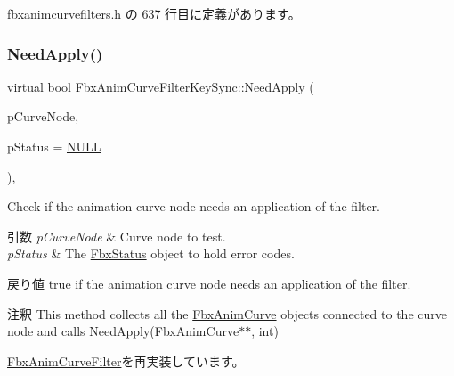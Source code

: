  fbxanimcurvefilters.\+h の 637 行目に定義があります。

\mbox{\label{class_fbx_anim_curve_filter_key_sync_a72cb983cb554a070688eb0990d4b7576}} 
\subsubsection{\texorpdfstring{Need\+Apply()}{NeedApply()}\hspace{0.1cm}{\footnotesize\ttfamily [3/5]}}
{\footnotesize\ttfamily virtual bool Fbx\+Anim\+Curve\+Filter\+Key\+Sync\+::\+Need\+Apply (\begin{DoxyParamCaption}\item[{\hyperlink{class_fbx_anim_curve_node}{Fbx\+Anim\+Curve\+Node} \&}]{p\+Curve\+Node,  }\item[{\hyperlink{class_fbx_status}{Fbx\+Status} $\ast$}]{p\+Status = {\ttfamily \hyperlink{fbxarch_8h_a070d2ce7b6bb7e5c05602aa8c308d0c4}{N\+U\+LL}} }\end{DoxyParamCaption})\hspace{0.3cm}{\ttfamily [inline]}, {\ttfamily [virtual]}}

Check if the animation curve node needs an application of the filter. 
\begin{DoxyParams}{引数}
{\em p\+Curve\+Node} & Curve node to test. \\
\hline
{\em p\+Status} & The \hyperlink{class_fbx_status}{Fbx\+Status} object to hold error codes. \\
\hline
\end{DoxyParams}
\begin{DoxyReturn}{戻り値}
{\ttfamily true} if the animation curve node needs an application of the filter. 
\end{DoxyReturn}
\begin{DoxyRemark}{注釈}
This method collects all the \hyperlink{class_fbx_anim_curve}{Fbx\+Anim\+Curve} objects connected to the curve node and calls Need\+Apply(\+Fbx\+Anim\+Curve$\ast$$\ast$, int) 
\end{DoxyRemark}


\hyperlink{class_fbx_anim_curve_filter_a2a88d855d34bb1f2f22ca8386020b33a}{Fbx\+Anim\+Curve\+Filter}を再実装しています。



